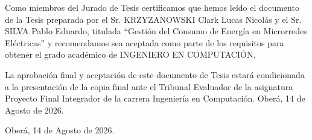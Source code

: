 \cleardoublepage

Como miembros del Jurado de Tesis certificamos que hemos leído el documento de la Tesis preparada por el Sr. KRZYZANOWSKI Clark Lucas Nicolás y el Sr. SILVA Pablo Eduardo, titulada “Gesti\'on del Consumo de Energía en Microrredes El\'ectricas” y recomendamos sea aceptada como parte de los requisitos para obtener el grado académico de INGENIERO EN COMPUTACIÓN.

La aprobación final y aceptación de este documento de Tesis estará condicionada a la presentación de la copia final ante el Tribunal Evaluador de la asignatura Proyecto Final Integrador de la carrera Ingeniería en Computación.
Oberá, 14 de Agosto de 2026.


\vfill
{}
\vfill
{}
\vfill
{}
\vfill


Oberá, 14 de Agosto de 2026.